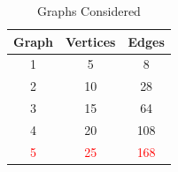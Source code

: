 \documentclass[longpaper, english, final, times]{revdetua}
\begin{document}
			\begin{table}[h]
				\caption{Graphs Considered}
				\label{table:graphsconsidered}
				{\renewcommand{\arraystretch}{2}
					\begin{center}
					\begin{tabular}{|c|c|c|}
						\hline
						Graph&Vertices&Edges \\
						\hline
						1&5&8\\
						\hline
						2&10&28\\
						\hline
						3&15&64\\
						\hline
						4&20&108\\
						\hline
						\textcolor{red}{5}&\textcolor{red}{25}&\textcolor{red}{168}\\
						\hline
					\end{tabular}
				\end{center}
				}
			\end{table}
		
\end{document}
